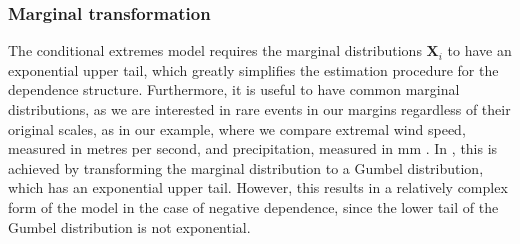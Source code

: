 \documentclass{article}
\numberwithin{equation}{section}
\begin{document}
\subsubsection{Marginal transformation}


The conditional extremes model requires the marginal distributions $\bm{X}_i$ to have an exponential upper tail, which greatly simplifies the estimation procedure for the dependence structure.
Furthermore, it is useful to have common marginal distributions, as we are interested in rare events in our margins regardless of their original scales, as in our example, where we compare extremal wind speed, measured in metres per second, and precipitation, measured in mm \citep{Winter2016}.
In \citet{Heffernan2004}, this is achieved by transforming the marginal distribution to a Gumbel distribution, which has an exponential upper tail.
However, this results in a relatively complex form of the model in the case of negative dependence, since the lower tail of the Gumbel distribution is not exponential.
\end{document}
